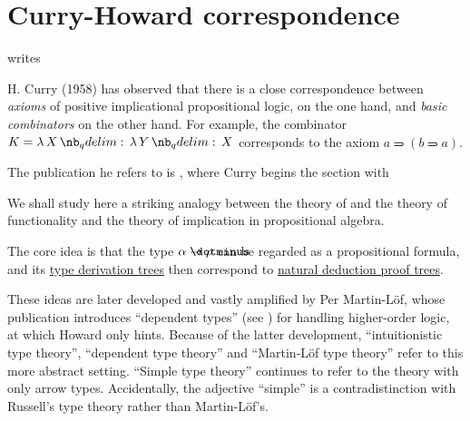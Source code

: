 \section{Curry-Howard correspondence}\label{sec:curry_howard_correspondence}

\begin{concept}\label{con:curry_howard_correspondence}
   writes
  \begin{displayquote}
    H. Curry (1958) has observed that there is a close correspondence between \textit{axioms} of positive implicational propositional logic, on the one hand, and \textit{basic combinators} on the other hand. For example, the combinator \( K = \qabs X \qabs Y X \) corresponds to the axiom \( a \rightimply (b \rightimply a) \).
  \end{displayquote}

  The publication he refers to is \cite[312]{CurryFeysCraig1958CombinatoryLogicVol1}, where Curry begins the section with
  \begin{displayquote}
    We shall study here a striking analogy between the theory of and the theory of functionality and the theory of implication in propositional algebra.
  \end{displayquote}

  The core idea is that the type \( \alpha \synimplies \rho \) can be regarded as a propositional formula, and its \hyperref[def:type_derivation_tree]{type derivation trees} then correspond to \hyperref[def:natural_deduction_proof_tree]{natural deduction proof trees}.

  These ideas are later developed and vastly amplified by Per Martin-L\"of, whose publication \cite{MartinLöf1975IntuitionisticTypeTheory} introduces \enquote{dependent types} (see ) for handling higher-order logic, at which Howard only hints. Because of the latter development, \enquote{intuitionistic type theory}, \enquote{dependent type theory} and \enquote{Martin-L\"of type theory} refer to this more abstract setting. \enquote{Simple type theory} continues to refer to the theory with only arrow types. Accidentally, the adjective \enquote{simple} is a contradistinction with Russell's type theory rather than Martin-L\"of's.


\end{concept}
